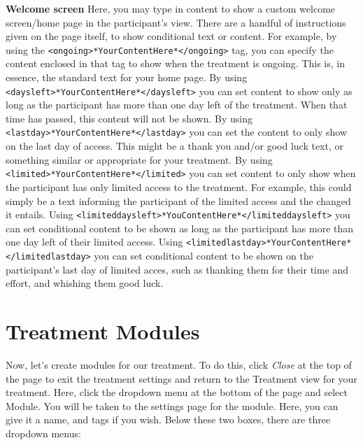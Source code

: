 \documentclass[]{book}
\begin{document}
\textbf{Welcome screen}
Here, you may type in content to show a custom welcome screen/home page in the participant's view. There are a handful of instructions given on the page itself, to show conditional text or content.
For example, by using the \texttt{\textless{}ongoing\textgreater{}*YourContentHere*\textless{}/ongoing\textgreater{}} tag, you can specify the content enclosed in that tag to show when the treatment is ongoing. This is, in essence, the standard text for your home page.
By using \texttt{\textless{}daysleft\textgreater{}*YourContentHere*\textless{}/daysleft\textgreater{}} you can set content to show only as long as the participant has more than one day left of the treatment. When that time has passed, this content will not be shown.
By using \texttt{\textless{}lastday\textgreater{}*YourContentHere*\textless{}/lastday\textgreater{}} you can set the content to only show on the last day of access. This might be a thank you and/or good luck text, or something similar or appropriate for your treatment.
By using \texttt{\textless{}limited\textgreater{}*YourContentHere*\textless{}/limited\textgreater{}} you can set content to only show when the participant has only limited access to the treatment. For example, this could simply be a text informing the participant of the limited access and the changed it entails.
Using \texttt{\textless{}limiteddaysleft\textgreater{}*YouContentHere*\textless{}/limiteddaysleft\textgreater{}} you can set conditional content to be shown as long as the participant has more than one day left of their limited access.
Using \texttt{\textless{}limitedlastday\textgreater{}*YourContentHere*\textless{}/limitedlastday\textgreater{}} you can set conditional content to be shown on the participant's last day of limited acces, such as thanking them for their time and effort, and whishing them good luck.

\hypertarget{treatment-modules}{%
\section{Treatment Modules}\label{treatment-modules}}

Now, let's create modules for our treatment. To do this, click \emph{Close} at the top of the page to exit the treatment settings and return to the Treatment view for your treatment. Here, click the dropdown menu at the bottom of the page and select Module. You will be taken to the settings page for the module. Here, you can give it a name, and tags if you wish. Below these two boxes, there are three dropdown menus:
\end{document}

